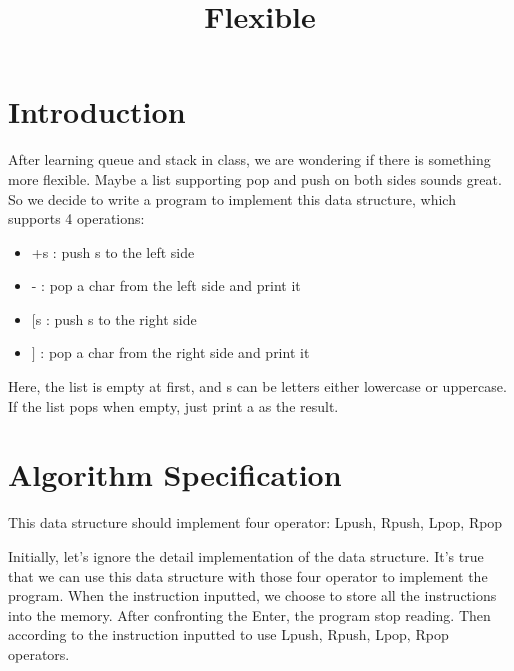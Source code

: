 \documentclass[twoside]{article}
\begin{document}
\begin{CJK*}{UTF8}{gbsn}
	\title{Flexible}
	\date{}

	\section{Introduction}

	After learning queue and stack in class, we are wondering if there is something more flexible. Maybe a list supporting pop and push on both sides sounds great. So we decide to write a program to implement this data structure, which supports 4 operations:
	\begin{itemize}
		\item +s : push s to the left side
		\item - : pop a char from the left side and print it
		\item $[$s : push s to the right side
		\item $]$ : pop a char from the right side and print it
	\end{itemize}

	Here, the list is empty at first, and s can be letters either lowercase or uppercase. If the list pops when empty, just print a  as the result.
	

	\section{Algorithm Specification}
	This data structure should implement four operator: Lpush, Rpush, Lpop, Rpop
	
	Initially, let's ignore the detail implementation of the data structure. It's true that we can use this data structure with those four operator to implement the program. When the instruction inputted, we choose to store all the instructions into the memory. After confronting the Enter, the program stop reading. Then according to the instruction inputted to use Lpush, Rpush, Lpop, Rpop operators.
	

\end{CJK*}
\end{document}
